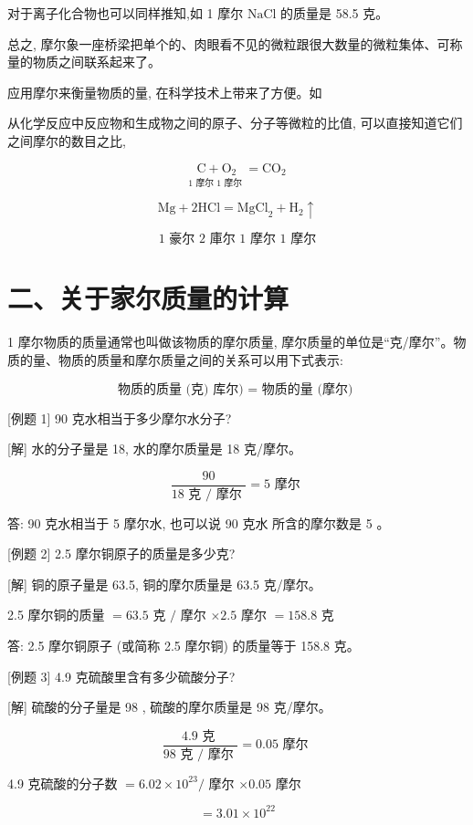 \documentclass[10pt]{article}
\begin{document}
对于离子化合物也可以同样推知,如 1 摩尔 \(\mathrm{{NaCl}}\) 的质量是 58.5 克。

总之, 摩尔象一座桥梁把单个的、肉眼看不见的微粒跟很大数量的微粒集体、可称量的物质之间联系起来了。

应用摩尔来衡量物质的量, 在科学技术上带来了方便。如

从化学反应中反应物和生成物之间的原子、分子等微粒的比值, 可以直接知道它们之间摩尔的数目之比,

\[
\underset{1\text{ 摩尔 }1\text{ 摩尔 }}{\mathrm{C} + {\mathrm{O}}_{2}} = {\mathrm{{CO}}}_{2}
\]

\[
\mathrm{{Mg}} + 2\mathrm{{HCl}} = {\mathrm{{MgCl}}}_{2} + {\mathrm{H}}_{2} \uparrow
\]

\[
\text{1 豪尔 2 庫尔 1 摩尔 1 摩尔}
\]

\section*{二、关于家尔质量的计算}

1 摩尔物质的质量通常也叫做该物质的摩尔质量, 摩尔质量的单位是“克/摩尔”。物质的量、物质的质量和摩尔质量之间的关系可以用下式表示:

\[
\text{物质的质量 (克) 库尔) } = \text{ 物质的量 (摩尔) }
\]

[例题 1] 90 克水相当于多少摩尔水分子?

[解] 水的分子量是 18, 水的摩尔质量是 18 克/摩尔。

\[
\frac{90}{{18}\text{ 克 }/\text{ 摩尔 }} = 5\text{ 摩尔 }
\]

答: 90 克水相当于 5 摩尔水, 也可以说 90 克水 所含的摩尔数是 5 。

[例题 2] 2.5 摩尔铜原子的质量是多少克?

[解] 铜的原子量是 63.5, 铜的摩尔质量是 63.5 克/摩尔。

2.5 摩尔铜的质量 \(= {63.5}\) 克 \(/\) 摩尔 \(\times {2.5}\) 摩尔 \(= {158.8}\) 克

答: 2.5 摩尔铜原子 (或简称 2.5 摩尔铜) 的质量等于 158.8 克。

[例题 3] 4.9 克硫酸里含有多少硫酸分子?

[解] 硫酸的分子量是 98 , 硫酸的摩尔质量是 98 克/摩尔。

\[
\frac{{4.9}\text{ 克 }}{{98}\text{ 克 }/\text{ 摩尔 }} = {0.05}\text{ 摩尔 }
\]

4.9 克硫酸的分子数 \(= {6.02} \times {10}^{23}/\) 摩尔 \(\times {0.05}\) 摩尔

\[
= {3.01} \times {10}^{22}
\]
\end{document}
